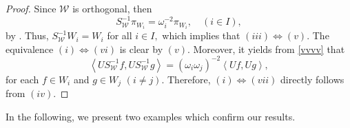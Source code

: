 \documentclass[sn-mathphys-num]{sn-jnl}%
\theoremstyle{definition}
\theoremstyle{remark}
\numberwithin{equation}{section}
\begin{document}
\begin{proof}
Since $\mathcal{W}$ is orthogonal, then 
\begin{equation}\label{vvvv}
S_{\mathcal{W}}^{-1}\pi_{W_{i}}=\omega_{i}^{-2}\pi_{W_{i}}, \quad (i \in I),
\end{equation}
by \cite[Proposition 3.3]{scaling weights}. Thus, $S_{\mathcal{W}}^{-1}W_{i}=W_{i}$ for all $ i \in I,$ which implies that $(iii)\Leftrightarrow (v).$ The equivalence $(i)\Leftrightarrow (vi)$ is clear by $(v).$ Moreover, it yields from \eqref{vvvv} that
\begin{equation*}
\left\langle  US_{\mathcal{W}}^{-1}f,US_{\mathcal{W}}^{-1}g\right\rangle  =\left( \omega_{i}\omega_{j}\right) ^{-2}\left\langle  Uf,Ug \right\rangle  ,
\end{equation*}
for each $f \in W_{i}$ and $g \in W_{j}$ $(i\neq j).$ Therefore, $(i)\Leftrightarrow (vii)$ directly follows from $(iv).$
\end{proof}

In the following, we present two examples which confirm our results.
\end{document}
